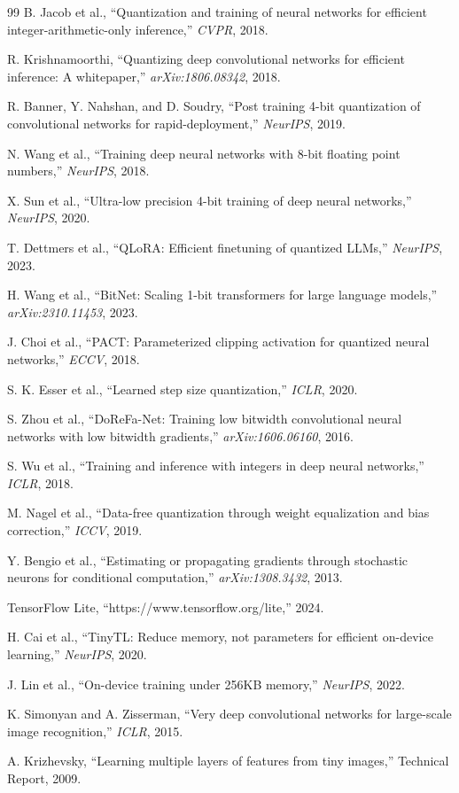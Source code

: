 \documentclass[conference]{IEEEtran}
\begin{document}
\begin{thebibliography}{99}
B. Jacob et al., ``Quantization and training of neural networks for efficient integer-arithmetic-only inference,'' \textit{CVPR}, 2018.

R. Krishnamoorthi, ``Quantizing deep convolutional networks for efficient inference: A whitepaper,'' \textit{arXiv:1806.08342}, 2018.

R. Banner, Y. Nahshan, and D. Soudry, ``Post training 4-bit quantization of convolutional networks for rapid-deployment,'' \textit{NeurIPS}, 2019.

N. Wang et al., ``Training deep neural networks with 8-bit floating point numbers,'' \textit{NeurIPS}, 2018.

X. Sun et al., ``Ultra-low precision 4-bit training of deep neural networks,'' \textit{NeurIPS}, 2020.

T. Dettmers et al., ``QLoRA: Efficient finetuning of quantized LLMs,'' \textit{NeurIPS}, 2023.

H. Wang et al., ``BitNet: Scaling 1-bit transformers for large language models,'' \textit{arXiv:2310.11453}, 2023.

J. Choi et al., ``PACT: Parameterized clipping activation for quantized neural networks,'' \textit{ECCV}, 2018.

S. K. Esser et al., ``Learned step size quantization,'' \textit{ICLR}, 2020.

S. Zhou et al., ``DoReFa-Net: Training low bitwidth convolutional neural networks with low bitwidth gradients,'' \textit{arXiv:1606.06160}, 2016.

S. Wu et al., ``Training and inference with integers in deep neural networks,'' \textit{ICLR}, 2018.

M. Nagel et al., ``Data-free quantization through weight equalization and bias correction,'' \textit{ICCV}, 2019.

Y. Bengio et al., ``Estimating or propagating gradients through stochastic neurons for conditional computation,'' \textit{arXiv:1308.3432}, 2013.

TensorFlow Lite, ``https://www.tensorflow.org/lite,'' 2024.

H. Cai et al., ``TinyTL: Reduce memory, not parameters for efficient on-device learning,'' \textit{NeurIPS}, 2020.

J. Lin et al., ``On-device training under 256KB memory,'' \textit{NeurIPS}, 2022.

K. Simonyan and A. Zisserman, ``Very deep convolutional networks for large-scale image recognition,'' \textit{ICLR}, 2015.

A. Krizhevsky, ``Learning multiple layers of features from tiny images,'' Technical Report, 2009.
\end{thebibliography}
\end{document}
